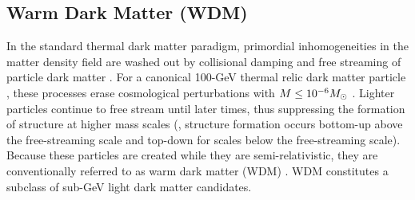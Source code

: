 \subsection{Warm Dark Matter (WDM)}
\label{sec:wdm}


In the standard thermal dark matter paradigm, primordial inhomogeneities in the matter density field are washed out by collisional damping and free streaming of particle dark matter \citep{Hofmann:2001,Green:2003un, Bertschinger:2006nq, Loeb:2005pm}.  
For a canonical 100-GeV thermal relic dark matter particle \citep[\eg, the WIMP;][]{Jungman:1995df}, these processes erase cosmological perturbations with $M \leq 10^{-6} M_\odot$ \citep[i.e., Earth mass;][]{Green:2003un}. 
Lighter particles continue to free stream until later times, thus suppressing the formation of structure at higher mass scales (\eg, structure formation occurs bottom-up above the free-streaming scale and top-down for scales below the free-streaming scale). Because these particles are created while they are semi-relativistic, they are conventionally referred to as warm dark matter (WDM) \citep{Bond:1983hb,Bode:2000gq,Dalcanton:2000hn}. 
WDM constitutes a subclass of sub-GeV light dark matter candidates.

